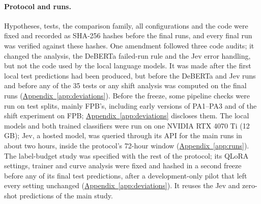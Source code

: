 \paragraph{Protocol and runs.}
Hypotheses, tests, the comparison family, all configurations and the code were fixed and recorded as SHA-256 hashes
before the final runs, and every final run was verified against these hashes. One amendment followed three
code audits; it changed the analysis, the DeBERTa failed-run rule and the Jev error handling, but not the code used by
the local language models. It was made after the first local test predictions had been produced, but before the
DeBERTa and Jev runs and before any of the 35 tests or any shift analysis was computed on the final runs
(\hyperref[app:deviations]{Appendix~\ref*{app:deviations}}). Before the freeze, some pipeline checks were run on test
splits, mainly FPB's, including early versions of PA1--PA3 and of the shift experiment on FPB;
\hyperref[app:deviations]{Appendix~\ref*{app:deviations}} discloses them.
The local models and both trained classifiers were run on one NVIDIA RTX 4070 Ti (12\,GB); Jev, a hosted model, was
queried through its API for the main runs in about two hours, inside the protocol's 72-hour window (\hyperref[app:runs]{Appendix~\ref*{app:runs}}).
The label-budget study was specified with the rest of the protocol; its QLoRA settings, trainer and curve analysis were
fixed and hashed in a second freeze before any of its final test predictions, after a development-only pilot that left every
setting unchanged (\hyperref[app:deviations]{Appendix~\ref*{app:deviations}}). It reuses the Jev and zero-shot
predictions of the main study.
